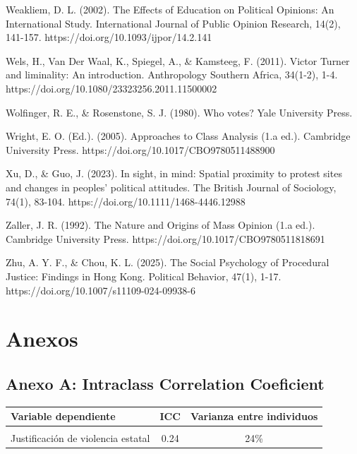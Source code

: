 \documentclass[
  13pt,
]{article}
\begin{document}
Weakliem, D. L. (2002). The Effects of Education on Political Opinions:
An International Study. International Journal of Public Opinion
Research, 14(2), 141-157. https://doi.org/10.1093/ijpor/14.2.141

Wels, H., Van Der Waal, K., Spiegel, A., \& Kamsteeg, F. (2011). Victor
Turner and liminality: An introduction. Anthropology Southern Africa,
34(1-2), 1-4. https://doi.org/10.1080/23323256.2011.11500002

Wolfinger, R. E., \& Rosenstone, S. J. (1980). Who votes? Yale
University Press.

Wright, E. O. (Ed.). (2005). Approaches to Class Analysis (1.a ed.).
Cambridge University Press. https://doi.org/10.1017/CBO9780511488900

Xu, D., \& Guo, J. (2023). In sight, in mind: Spatial proximity to
protest sites and changes in peoples' political attitudes. The British
Journal of Sociology, 74(1), 83-104.
https://doi.org/10.1111/1468-4446.12988

Zaller, J. R. (1992). The Nature and Origins of Mass Opinion (1.a ed.).
Cambridge University Press. https://doi.org/10.1017/CBO9780511818691

Zhu, A. Y. F., \& Chou, K. L. (2025). The Social Psychology of
Procedural Justice: Findings in Hong Kong. Political Behavior, 47(1),
1-17. https://doi.org/10.1007/s11109-024-09938-6

\section{Anexos}\label{anexos}

\subsection{Anexo A: Intraclass Correlation
Coeficient}\label{anexo-a-intraclass-correlation-coeficient}

\begin{table}[!h]
\centering\begingroup\fontsize{9}{11}\selectfont

\begin{tabular}{lcc}
\toprule
Variable dependiente & ICC & Varianza entre individuos\\
\midrule
\cellcolor{gray!10}{Justificación de violencia en protestas} & \cellcolor{gray!10}{0.24} & \cellcolor{gray!10}{24\%}\\
Justificación de violencia estatal & 0.24 & 24\%\\
\bottomrule
\end{tabular}
\endgroup{}
\end{table}
\end{document}
